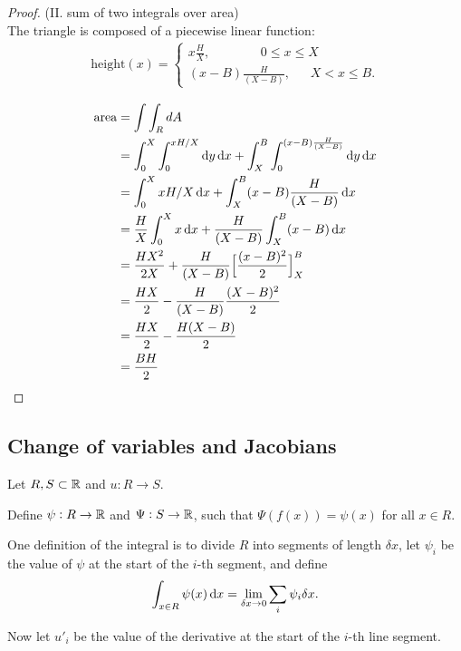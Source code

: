 \begin{proof}(II. sum of two integrals over area)\\
  The triangle is composed of a piecewise linear function:
  \begin{align*}
    \text{height}(x) =
    \begin{cases}
      x\frac{H}{X}, ~~~~~~~~~~~~~~~~~~     0 \leq x \leq X\\
      (x - B)\frac{H}{(X - B)}, ~~~~~~~ X < x \leq B.
    \end{cases}
  \end{align*}

  \begin{align*}
    \text{area} &= \int\int_R dA\\
                &= \int_0^X \int_0^{xH/X} \dy \dx + \int_X^B\int_0^{(x - B)\frac{H}{(X - B)}}\dy\dx\\
                &= \int_0^X xH/X \dx + \int_X^B (x - B)\frac{H}{(X - B)} \dx\\
                &= \frac{H}{X}\int_0^X x \dx + \frac{H}{(X - B)}\int_X^B (x - B) \dx\\
                &= \frac{HX^2}{2X} + \frac{H}{(X - B)}\Big[\frac{(x - B)^2}{2}\Big]_X^B\\
                &= \frac{HX}{2} - \frac{H}{(X - B)}\frac{(X - B)^2}{2}\\
                &= \frac{HX}{2} - \frac{H(X - B)}{2}\\
                &= \frac{BH}{2}
  \end{align*}
\end{proof}


\newpage
\subsection{Change of variables and Jacobians}
Let $R, S \subset \mathbb{R}$ and $u:R \to S$.

Define $\psi: R \to \mathbb{R}$ and $\Psi: S \to \mathbb{R}$, such that $\Psi(f(x)) = \psi(x)$ for all $x \in R$.

One definition of the integral is to divide $R$ into segments of length $\delta x$, let $\psi_i$ be
the value of $\psi$ at the start of the $i$-th segment, and define
\begin{align*}
  \int_{x \in R} \psi(x) \dx = \lim_{\delta x \to 0} \sum_i \psi_i\delta x.
\end{align*}

Now let $u'_i$ be the value of the derivative at the start of the $i$-th line segment.

